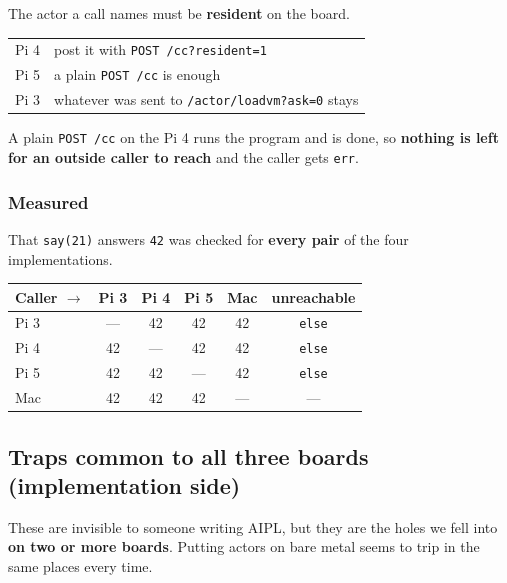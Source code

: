 \documentclass[11pt,a4paper]{article}
\begin{document}
The actor a call names must be \textbf{resident} on the board.

\begin{center}
\small
\begin{tabular}{@{}ll@{}}
\toprule
Pi 4 & post it with \texttt{POST /cc?resident=1} \\
Pi 5 & a plain \texttt{POST /cc} is enough \\
Pi 3 & whatever was sent to \texttt{/actor/loadvm?ask=0} stays \\
\bottomrule
\end{tabular}
\end{center}

A plain \texttt{POST /cc} on the Pi 4 runs the program and is done, so
\textbf{nothing is left for an outside caller to reach} and the caller gets
\texttt{err}.

\subsubsection*{Measured}

That \texttt{say(21)} answers \texttt{42} was checked for \textbf{every pair} of
the four implementations.

\begin{center}
\small
\begin{tabular}{@{}lccccc@{}}
\toprule
Caller $\rightarrow$ & Pi 3 & Pi 4 & Pi 5 & Mac & unreachable \\
\midrule
Pi 3 & --- & 42 & 42 & 42 & \texttt{else} \\
Pi 4 & 42 & --- & 42 & 42 & \texttt{else} \\
Pi 5 & 42 & 42 & --- & 42 & \texttt{else} \\
Mac  & 42 & 42 & 42 & --- & --- \\
\bottomrule
\end{tabular}
\end{center}

\subsection{Traps common to all three boards (implementation side)}
\label{sec:three-boards-traps}

These are invisible to someone writing AIPL, but they are the holes we fell
into \textbf{on two or more boards}. Putting actors on bare metal seems to trip
in the same places every time.
\end{document}
